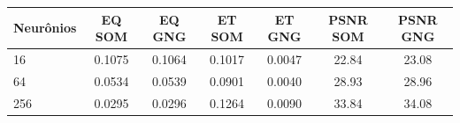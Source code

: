 \begin{tabular}{lcccccc}
\toprule
Neurônios & EQ SOM & EQ GNG & ET SOM & ET GNG & PSNR SOM & PSNR GNG\\
\midrule
16 & 0.1075 & 0.1064 & 0.1017 & 0.0047 & 22.84 & 23.08\\
64 & 0.0534 & 0.0539 & 0.0901 & 0.0040 & 28.93 & 28.96\\
256 & 0.0295 & 0.0296 & 0.1264 & 0.0090 & 33.84 & 34.08\\
\bottomrule
\end{tabular}
